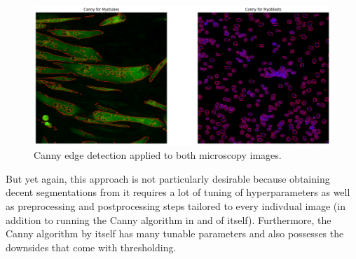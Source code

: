\begin{figure}
	\centering
	\includegraphics[width=\textwidth]{"images/canny.png"}
	\caption{Canny edge detection applied to both microscopy images.}
	\label{figcanny}
\end{figure}

But yet again, this approach is not particularly desirable because obtaining decent segmentations from it requires a lot of tuning of hyperparameters as well as preprocessing and postprocessing steps tailored to every indivdual image (in addition to running the Canny algorithm in and of itself). Furthermore, the Canny algorithm by itself has many tunable parameters and also possesses the downsides that come with thresholding.
\newpage
